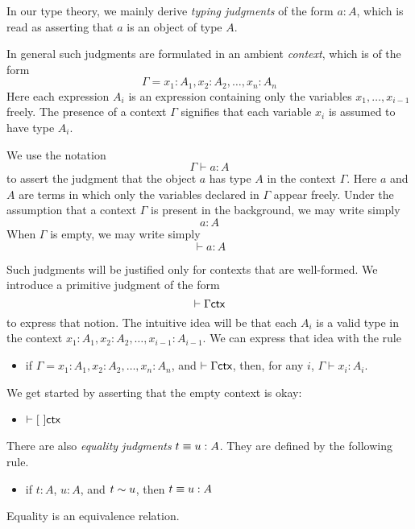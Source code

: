 In our type theory, we mainly derive {\em typing judgments} of the form $a:A$,
which is read as asserting that $a$ is an object of type $A$.

In general such judgments are formulated in an ambient {\em context}, which
is of the form
\[
  \Gamma =  x_1:A_1, x_2:A_2,\dots,x_n:A_n
\]
Here each expression $A_i$ is an expression containing only the variables
$x_1,\dots,x_{i-1}$ freely.  The presence of a context $\Gamma$ signifies that
each variable $x_i$ is assumed to have type $A_i$.

We use the notation
\[
  \Gamma \vdash a:A
\]
to assert the judgment that the object $a$ has type $A$ in the context
$\Gamma$.  Here $a$ and $A$ are terms in which only the variables declared in
$\Gamma$ appear freely.  Under the assumption that a context $\Gamma$ is
present in the background, we may write simply
\[
  a:A
\]
When $\Gamma$ is empty, we may write simply
\[
  \vdash a:A
\]

Such judgments will be justified only for contexts that are well-formed.  We
introduce a primitive judgment of the form
\[
  \vdash \Gamma \textsf{ctx}
\]
to express that notion.  The intuitive idea will be that each $A_i$ is a valid
type in the context $x_1:A_1, x_2:A_2,\dots,x_{i-1}:A_{i-1}$.  We can express that idea with 
the rule
\begin{itemize}
\item if $\Gamma =  x_1:A_1, x_2:A_2,\dots,x_n:A_n$, and $\vdash \Gamma \textsf{ctx}$, then, for any $i$, $\Gamma \vdash x_i : A_i$.
\end{itemize}
We get started by asserting that the empty context is okay:
\begin{itemize}
\item $\vdash [\ ] \textsf{ctx}$
\end{itemize}
There are also {\em equality judgments} $t \equiv u : A$.  They are defined by
the following rule.
\begin{itemize}
\item if $t:A$, $u:A$, and $t \sim u$, then $t \equiv u : A$
\end{itemize}
Equality is an equivalence relation.


